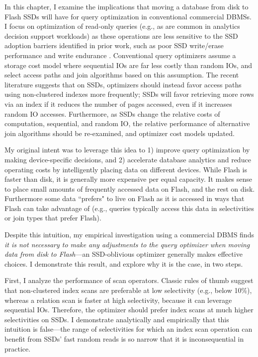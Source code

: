 In this chapter, I examine the implications that moving a database from disk to Flash SSDs will have for query optimization in conventional commercial DBMSs.
I focus on optimization of read-only queries (e.g., as are common in analytics decision support workloads) as these operations are less sensitive to the SSD adoption barriers identified in prior work, such as poor SSD write/erase performance \cite{Chen2009} and write endurance \cite{Roberts2009}.
Conventional query optimizers assume a storage cost model where sequential IOs are far less costly than random IOs, and select access paths and join algorithms based on this assumption.
The recent literature \cite{Baumann2010} suggests that on SSDs, optimizers should instead favor access paths using non-clustered indexes more frequently; SSDs will favor retrieving more rows via an index if it reduces the number of pages accessed, even if it increases random IO accesses.
Furthermore, as SSDs change the relative costs of computation, sequential, and random IO, the relative performance of alternative join algorithms should be re-examined, and optimizer cost models updated.

My original intent was to leverage this idea to 1) improve query optimization by making device-specific decisions, and 2) accelerate database analytics and reduce operating costs by intelligently placing data on different devices.
While Flash is faster than disk, it is generally more expensive per equal capacity.
It makes sense to place small amounts of frequently accessed data on Flash, and the rest on disk.
Furthermore some data ``prefers" to live on Flash as it is accessed in ways that Flash can take advantage of (e.g., queries typically access this data in selectivities or join types that prefer Flash).

Despite this intuition, my empirical investigation using a commercial DBMS finds \emph{it is not necessary to make any adjustments to the query optimizer when moving data from disk to Flash}---an SSD-oblivious optimizer generally makes effective choices.
I demonstrate this result, and explore why it is the case, in two steps.

First, I analyze the performance of scan operators.  
Classic rules of thumb suggest that non-clustered index scans are preferable at low selectivity (e.g., below 10\%), whereas a relation scan is faster at high selectivity, because it can leverage sequential IOs.
Therefore, the optimizer should prefer index scans at much higher selectivities on SSDs.  
I demonstrate analytically and empirically that this intuition is false---the range of selectivities for which an index scan operation can benefit from SSDs' fast random reads is so narrow that it is inconsequential in practice.

